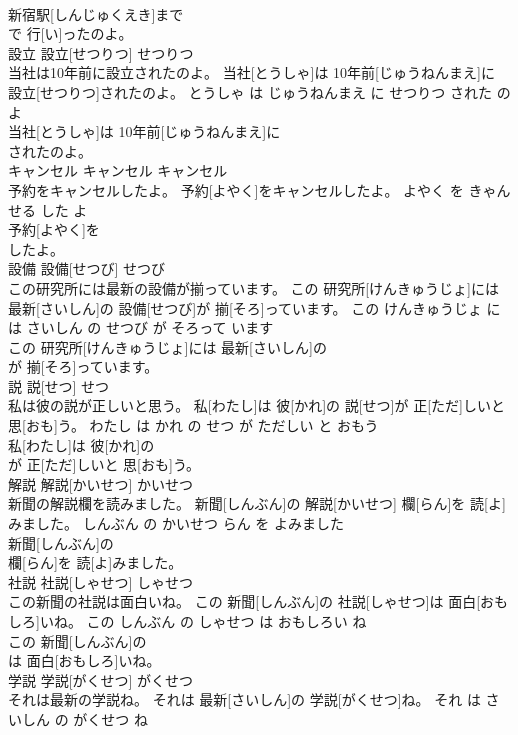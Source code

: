 \documentclass[8pt]{extreport}
\begin{document}
\begin{CJK}{UTF8}{min}
\\	新宿駅[しんじゅくえき]まで
\\	で 行[い]ったのよ。			
\\	設立	設立[せつりつ]	せつりつ	
\\	当社は10年前に設立されたのよ。	当社[とうしゃ]は 10年前[じゅうねんまえ]に 設立[せつりつ]されたのよ。	とうしゃ は じゅうねんまえ に せつりつ された の よ	
\\	当社[とうしゃ]は 10年前[じゅうねんまえ]に
\\	されたのよ。			
\\	キャンセル	キャンセル	キャンセル	
\\	予約をキャンセルしたよ。	予約[よやく]をキャンセルしたよ。	よやく を きゃんせる した よ	
\\	予約[よやく]を
\\	したよ。			
\\	設備	設備[せつび]	せつび	
\\	この研究所には最新の設備が揃っています。	この 研究所[けんきゅうじょ]には 最新[さいしん]の 設備[せつび]が 揃[そろ]っています。	この けんきゅうじょ に は さいしん の せつび が そろって います	
\\	この 研究所[けんきゅうじょ]には 最新[さいしん]の
\\	が 揃[そろ]っています。			
\\	説	説[せつ]	せつ	
\\	私は彼の説が正しいと思う。	私[わたし]は 彼[かれ]の 説[せつ]が 正[ただ]しいと 思[おも]う。	わたし は かれ の せつ が ただしい と おもう	
\\	私[わたし]は 彼[かれ]の
\\	が 正[ただ]しいと 思[おも]う。			
\\	解説	解説[かいせつ]	かいせつ	
\\	新聞の解説欄を読みました。	新聞[しんぶん]の 解説[かいせつ] 欄[らん]を 読[よ]みました。	しんぶん の かいせつ らん を よみました	
\\	新聞[しんぶん]の
\\	欄[らん]を 読[よ]みました。			
\\	社説	社説[しゃせつ]	しゃせつ	
\\	この新聞の社説は面白いね。	この 新聞[しんぶん]の 社説[しゃせつ]は 面白[おもしろ]いね。	この しんぶん の しゃせつ は おもしろい ね	
\\	この 新聞[しんぶん]の
\\	は 面白[おもしろ]いね。			
\\	学説	学説[がくせつ]	がくせつ	
\\	それは最新の学説ね。	それは 最新[さいしん]の 学説[がくせつ]ね。	それ は さいしん の がくせつ ね	

\end{CJK}
\end{document}
